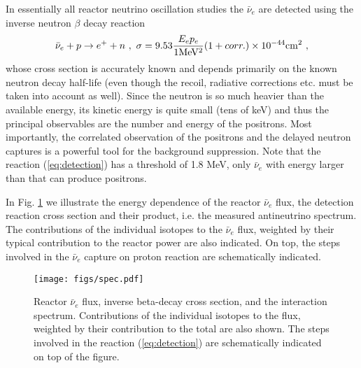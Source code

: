 In essentially all reactor neutrino oscillation studies the $\bar{\nu}_e$ are detected using the inverse neutron $\beta$ decay reaction
  \begin{equation}
  \bar{\nu}_e + p \rightarrow e^+ + n~, \\ ~ \sigma = 9.53 \frac{E_e p_e}{ 1  {\rm MeV^2}} (1 + corr.) \times 10^{-44} {\rm cm^2} ~,
  \label{eq:detection}
  \end{equation}
  whose cross section is accurately known \cite{VB99, Strumia} and depends primarily on the known neutron decay half-life (even though the recoil, radiative
  corrections etc. must be taken into account as well). Since the neutron is so much heavier than the available energy, its kinetic energy is quite
  small (tens of keV) and thus the principal observables are the number and energy of the positrons. Most importantly, the correlated observation of the
  positrons and the delayed neutron captures is a powerful tool for the background suppression. Note that the reaction (\ref{eq:detection}) has
  a threshold of 1.8 MeV, only $\bar{\nu}_e$ with energy larger than that can produce positrons. 
  
  In Fig. \ref{fig:spectra} we illustrate the energy dependence of the reactor $\bar{\nu}_e$ flux, the detection reaction cross section and their product,
  i.e. the measured antineutrino spectrum. The contributions of the individual isotopes to the $\bar{\nu}_e$ flux, weighted by their typical contribution
  to the reactor power are also indicated. On top, the steps involved in the $\bar{\nu}_e$ capture on proton reaction are schematically indicated. 
    

\begin{figure}[htb]
\begin{centering}
\texttt{[image: figs/spec.pdf]}
\par\end{centering}
\caption{\label{fig:spectra} Reactor $\bar{\nu}_e$ flux, inverse beta-decay cross section,
and the interaction spectrum. Contributions of the individual isotopes to the flux, weighted by their contribution to the total are also shown.
The steps involved in the reaction (\ref{eq:detection}) are schematically indicated on top of the figure.   }
\end{figure}
